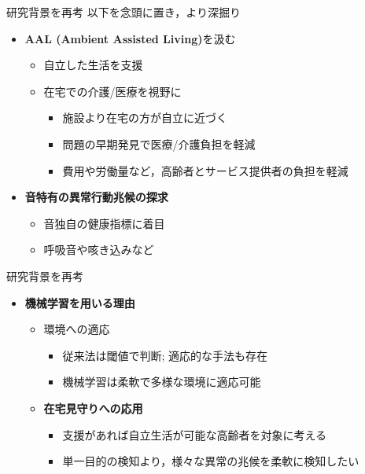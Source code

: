 \documentclass[unicode,12pt,aspectratio=169,dvipdfmx]{beamer}
\begin{document}
\begin{frame}{研究背景を再考}
    以下を念頭に置き，より深掘り
    \begin{itemize}
        \item \textbf{AAL (Ambient Assisted Living)}を汲む
        \begin{itemize}
            \item 自立した生活を支援
            \item 在宅での介護/医療を視野に
            \begin{itemize}
                \item 施設より在宅の方が自立に近づく
                \item 問題の早期発見で医療/介護負担を軽減
                \item 費用や労働量など，高齢者とサービス提供者の負担を軽減
            \end{itemize}
        \end{itemize}
    \item \textbf{音特有の異常行動兆候の探求}
        \begin{itemize}
            \item 音独自の健康指標に着目
            \item 呼吸音や咳き込みなど
        \end{itemize}
    \end{itemize}
\end{frame}


\begin{frame}{研究背景を再考}
  \begin{itemize}
    \item \textbf{機械学習を用いる理由}
    \begin{itemize}
        \item 環境への適応
        \begin{itemize}
            \item 従来法は閾値で判断; 適応的な手法も存在
            \item 機械学習は柔軟で多様な環境に適応可能
        \end{itemize}
        \item \textbf{在宅見守りへの応用}
        \begin{itemize}
            \item 支援があれば自立生活が可能な高齢者を対象に考える
            \item 単一目的の検知より，様々な異常の兆候を柔軟に検知したい
        \end{itemize}
    \end{itemize}
  \end{itemize}
\end{frame}
\end{document}
